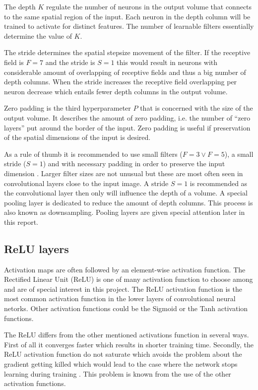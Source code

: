 The depth $K$ regulate the number of neurons in the output volume that connects to the same spatial region of the input. Each neuron in the depth column will be trained to activate for distinct features. The number of learnable filters essentially determine the value of $K$.

The stride determines the spatial stepsize movement of the filter. If the
receptive field is $F = 7$ and the stride is $S = 1$ this would result in
neurons with considerable amount of overlapping of receptive fields and thus a
big number of depth columns. When the stride increases the receptive field
overlapping per neuron decrease which entails fewer depth columns in the output
volume.

Zero padding is the third hyperparameter $P$ that is concerned with the size of
the output volume. It describes the amount of zero padding, i.e. the number of
``zero layers'' put around the border of the input. Zero padding is useful if
preservation of the spatial dimensions of the input is desired.

As a rule of thumb it is recommended to use small filters ($F=3 \vee F=5$), a
small stride ($S=1$) and with necessary padding in order to preserve
the input dimension \cite{cs231n}. Larger filter sizes are not unusual but these
are most often seen in convolutional layers close to the input image. A stride
$S=1$ is recommended as the convolutional layer then only will influence the
depth of a volume. A special pooling layer is dedicated to reduce the amount of
depth columns. This process is also known as downsampling. Pooling layers are
given special attention later in this report.

\subsection{ReLU layers} %
\label{sub:relu_layers}

Activation maps are often followed by an element-wise activation function. The Rectified Linear Unit (ReLU) is one of many activation function to choose among and are of special interest in this project. The ReLU activation function is the most common activation function in the lower layers of convolutional neural netorks. Other activation functions could be the Sigmoid or the Tanh activation functions.

The ReLU differs from the other mentioned activations function in several ways.
First of all it converges faster which results in shorter training time.
Secondly, the ReLU activation function do not saturate which avoids the problem
about the gradient getting killed which would lead to the case where the network
stops learning during training \cite{cs231n}. This problem is known from the use
of the other activation functions.

